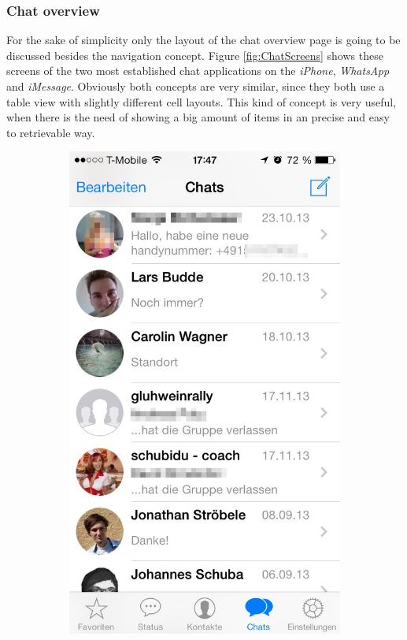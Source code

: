 \subsubsection{Chat overview}
\label{sec:ChatOverview}
For the sake of simplicity only the layout of the chat overview page is going to be discussed besides the navigation concept. Figure \vref{fig:ChatScreens} shows these screens of the two most established chat applications on the \emph{iPhone}, \emph{WhatsApp} and \emph{iMessage}. Obviously both concepts are very similar, since they both use a table view with slightly different cell layouts. This kind of concept is very useful, when there is the need of showing a big amount of items in an precise and easy to retrievable way. 

\begin{figure}[h]
	\centering
	\begin{subfigure}{.33\textwidth}
  		\centering
  		\includegraphics[width=0.98\linewidth]{./images/whatsapp-screen.jpg}

\end{subfigure}
\end{figure}
